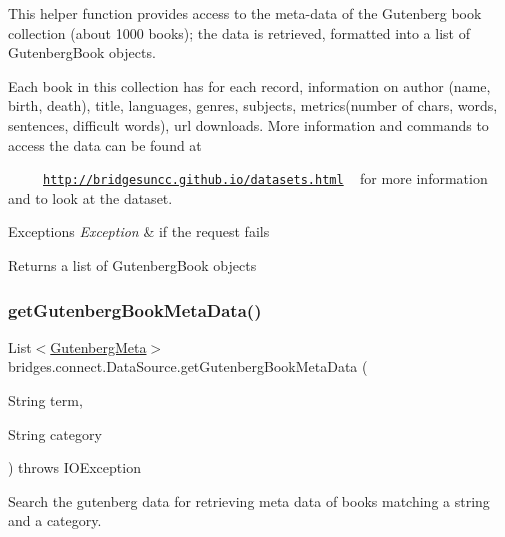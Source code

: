 This helper function provides access to the meta-\/data of the Gutenberg book collection (about 1000 books); the data is retrieved, formatted into a list of Gutenberg\+Book objects.

Each book in this collection has for each record, information on author (name, birth, death), title, languages, genres, subjects, metrics(number of chars, words, sentences, difficult words), url downloads. More information and commands to access the data can be found at 

~~~~~\href{http://bridgesuncc.github.io/datasets.html}{\tt http\+://bridgesuncc.\+github.\+io/datasets.\+html} ~\newline
 for more information and to look at the dataset.


\begin{DoxyExceptions}{Exceptions}
{\em Exception} & if the request fails\\
\hline
\end{DoxyExceptions}
\begin{DoxyReturn}{Returns}
a list of Gutenberg\+Book objects 
\end{DoxyReturn}
\mbox{\label{classbridges_1_1connect_1_1_data_source_a7f27778f3a8fcd01a2504b19d35eda14}} 
\subsubsection{\texorpdfstring{get\+Gutenberg\+Book\+Meta\+Data()}{getGutenbergBookMetaData()}\hspace{0.1cm}{\footnotesize\ttfamily [2/2]}}
{\footnotesize\ttfamily List$<$\hyperlink{classbridges_1_1data__src__dependent_1_1_gutenberg_meta}{Gutenberg\+Meta}$>$ bridges.\+connect.\+Data\+Source.\+get\+Gutenberg\+Book\+Meta\+Data (\begin{DoxyParamCaption}\item[{String}]{term,  }\item[{String}]{category }\end{DoxyParamCaption}) throws I\+O\+Exception}



Search the gutenberg data for retrieving meta data of books matching a string and a category. 


